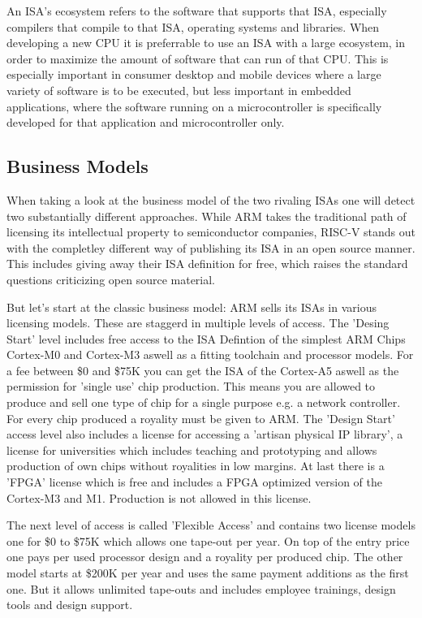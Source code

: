 \documentclass[conference]{IEEEtran}
\begin{document}
An \gls{ISA}'s ecosystem refers to the software that supports that \gls{ISA}, especially compilers that compile to that \gls{ISA}, operating systems and libraries.
When developing a new \gls{CPU} it is preferrable to use an \gls{ISA} with a large ecosystem, in order to maximize the amount of software
that can run of that \gls{CPU}. This is especially important in consumer desktop and mobile devices where a large variety of software is to be executed,
but less important in embedded applications, where the software running on a microcontroller is specifically developed for that application and microcontroller
only.

	\subsection{Business Models}
	When taking a look at the business model of the two rivaling \glspl{ISA} one will detect two substantially different approaches. While ARM takes the traditional path of licensing its intellectual property to semiconductor companies, RISC-V stands out with the completley different way of publishing its \gls{ISA} in an open source manner. This includes giving away their \gls{ISA} definition for free, which raises the standard questions criticizing open source material.

	But let's start at the classic business model: ARM sells its \glspl{ISA} in various licensing models. \cite{ARMLC} These are staggerd in multiple levels of access. The 'Desing Start' level includes free access to the \gls{ISA} Defintion of the simplest ARM Chips Cortex-M0 and Cortex-M3 aswell as a fitting toolchain and processor models. For a fee between \$0 and \$75K you can get the \gls{ISA} of the Cortex-A5 aswell as the permission for 'single use' chip production. This means you are allowed to produce and sell one type of chip for a single purpose e.g. a network controller. For every chip produced a royality must be given to ARM. The 'Design Start' access level also includes a license for accessing a 'artisan physical IP library', a license for universities which includes teaching and prototyping and allows production of own chips without royalities in low margins. At last there is a '\acrshort{FPGA}' license which is free and includes a \gls{FPGA} optimized version of the Cortex-M3 and M1. Production is not allowed in this license.

	The next level of access is called 'Flexible Access' and contains two license models one for \$0 to \$75K which allows one tape-out per year. On top of the entry price one pays per used processor design and a royality per produced chip. The other model starts at \$200K per year and uses the same payment additions as the first one. But it allows unlimited tape-outs and includes employee trainings, design tools and design support.
\end{document}
